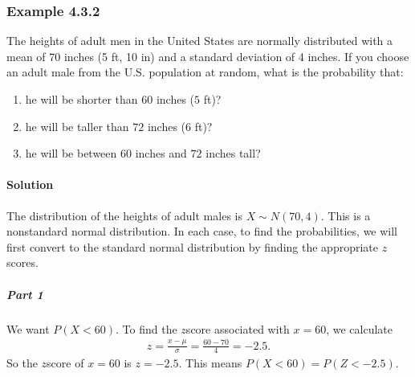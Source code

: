 \documentclass[letterpaper,10pt,english]{jupyterBook}
\begin{document}
\subsubsection{Example 4.3.2}
\label{\detokenize{Ch4 The Normal Distribution and the Central Limit Theorem/4.3 The Normal Distribution and z-scores:example-4-3-2}}
\sphinxAtStartPar
The heights of adult men in the United States are normally distributed with a mean of 70 inches (5 ft, 10 in) and a standard deviation of 4 inches. If you choose an adult male from the U.S. population at random, what is the probability that:
\begin{enumerate}
%
\item {} 
\sphinxAtStartPar
he will be shorter than \(60\) inches (\(5\) ft)?

\item {} 
\sphinxAtStartPar
he will be taller than \(72\) inches (\(6\) ft)?

\item {} 
\sphinxAtStartPar
he will be between \(60\) inches and \(72\) inches tall?

\end{enumerate}


\paragraph{Solution}
\label{\detokenize{Ch4 The Normal Distribution and the Central Limit Theorem/4.3 The Normal Distribution and z-scores:id1}}
\sphinxAtStartPar
The distribution of the heights of adult males is \(X \sim N(70, 4)\). This is a non\sphinxhyphen{}standard normal distribution. In each case, to find the probabilities, we will first convert to the standard normal distribution by finding the appropriate \(z\)\sphinxhyphen{}scores.


\subparagraph{Part 1}
\label{\detokenize{Ch4 The Normal Distribution and the Central Limit Theorem/4.3 The Normal Distribution and z-scores:id2}}
\sphinxAtStartPar
We want \(P(X < 60)\). To find the \(z\)\sphinxhyphen{}score associated with \(x = 60\), we calculate
\begin{equation*}
\begin{split} z = \frac{x - \mu}{\sigma} = \frac{60 - 70}{4} = -2.5. \end{split}
\end{equation*}
\sphinxAtStartPar
So the \(z\)\sphinxhyphen{}score of \(x = 60\) is \(z = -2.5\). This means \(P(X < 60) = P(Z < -2.5)\).
\end{document}
